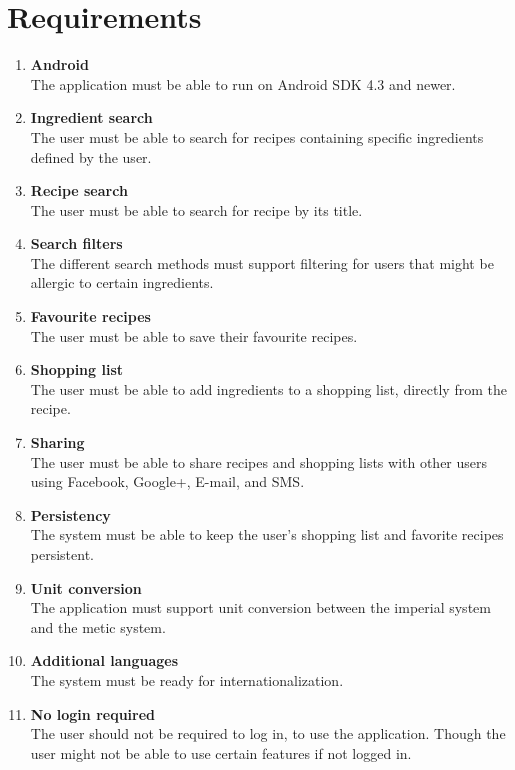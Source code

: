 \section{Requirements}
\begin{enumerate}
  \item\label{req:android} \textbf{Android} \\
    The application must be able to run on Android SDK 4.3 and newer.
    
  \item\label{req:ingredientsearch} \textbf{Ingredient search} \\
    The user must be able to search for recipes containing specific ingredients defined by the user.
    
  \item\label{req:recipesearch} \textbf{Recipe search} \\
    The user must be able to search for recipe by its title.
    
  \item\label{req:searchfilters} \textbf{Search filters} \\
    The different search methods must support filtering for users that might be allergic to certain ingredients.
    
  \item\label{req:favourite} \textbf{Favourite recipes} \\
    The user must be able to save their favourite recipes.
    
  \item\label{req:shoppinglist} \textbf{Shopping list} \\
    The user must be able to add ingredients to a shopping list, directly from the recipe.
    
  \item\label{req:sharing} \textbf{Sharing} \\
    The user must be able to share recipes and shopping lists with other users using Facebook, Google+, E-mail, and SMS.
    
  \item\label{req:persistency} \textbf{Persistency} \\
    The system must be able to keep the user's shopping list and favorite recipes persistent.
    
  \item\label{req:unitconversion} \textbf{Unit conversion} \\
    The application must support unit conversion between the imperial system and the metic system.
    
  \item\label{req:additionallanguages} \textbf{Additional languages} \\
    The system must be ready for internationalization.
  
  \item\label{req:Nologinrequired} \textbf{No login required} \\
    The user should not be required to log in, to use the application. Though the user might not be able to use certain features if not logged in.
\end{enumerate}